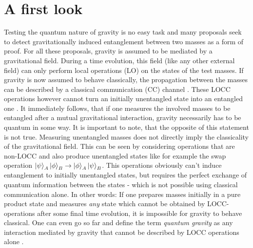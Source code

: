 \chapter{A first look}\label{cha:first-look}

Testing the quantum nature of gravity is no easy task and many proposals seek to detect gravitationally induced entanglement between two masses \cite{Krisnanda_2020,Chevalier_2020,Pedernales_2019,Bose_2017} as a form of proof. 
For all these proposals, gravity is assumed to be mediated by a gravitational field.
During a time evolution, this field (like any other external field) can only perform local operations (LO) on the states of the test masses. If gravity is now assumed to behave classically, the propagation between the masses can be described by a classical communication (CC) channel \cite{Lami_2024,Bose_2017}.
These LOCC operations however cannot turn an initially unentangled state into an entangled one \cite{Horodecki_2009, Plenio_2005a}.
It immediately follows, that if one measures the involved masses to be entangled after a mutual gravitational interaction, gravity necessarily has to be quantum in some way.
It is important to note, that the opposite of this statement is not true. Measuring unentangled masses does not directly imply the classicality of the gravitational field.
This can be seen by considering operations that are non-LOCC and also produce unentangled states like for example the swap operation $\ket{\psi}_A\ket{\phi}_B \rightarrow \ket{\phi}_A\ket{\psi}_B$. This operations obviously can't induce entanglement to initially unentangled states, but requires the perfect exchange of quantum information between the states - which is not possible using classical communication alone.
In other words: If one prepares masses initially in a pure product state and measures \textit{any} state which cannot be obtained by LOCC-operations after some final time evolution, it is impossible for gravity to behave classical. One can even go so far and define the term \emph{quantum gravity} as any interaction mediated by gravity that cannot be described by LOCC operations alone \cite{Lami_2024}.

